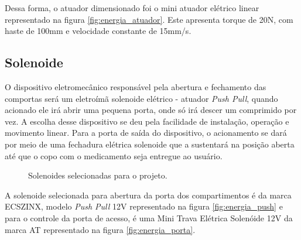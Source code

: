 Dessa forma, o atuador dimensionado foi o mini atuador elétrico linear representado na figura \ref{fig:energia_atuador}. Este apresenta torque de 20N, com haste de 100mm e velocidade constante de 15mm/s.

\subsection{Solenoide}\label{energ:solenoide}

O dispositivo eletromecânico responsável pela abertura e fechamento das comportas será um eletroímã solenoide elétrico - atuador \textit{Push Pull}, quando acionado ele irá abrir uma pequena porta, onde só irá descer um comprimido por vez. A escolha desse dispositivo se deu pela facilidade de instalação, operação e movimento linear.
Para a porta de saída do dispositivo, o acionamento se dará por meio de uma fechadura elétrica solenoide que a sustentará na posição aberta até que o copo com o medicamento seja entregue ao usuário.

\begin{figure}[H]
\centering
{}
\qquad
{}
\caption{Solenoides selecionadas para o projeto.}
\end{figure}

A solenoide selecionada para abertura da porta dos compartimentos é da marca ECSZINX, modelo \textit{Push Pull} 12V representado na figura \ref{fig:energia_push} e para o controle da porta de acesso, é uma Mini Trava Elétrica Solenóide 12V da marca AT representado na figura \ref{fig:energia_porta}.

